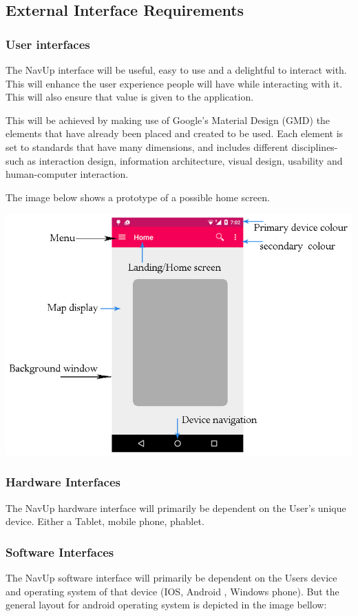 \documentclass[11pt]{article}
\begin{document}
		\subsection{External Interface Requirements}
      	\subsubsection{User interfaces}
				
				The NavUp interface will be useful, easy to use and a delightful to interact with. This will enhance the user experience people will have while interacting with it. This will also ensure that value is given to the application.
				
				This will be achieved by making use of Google's Material Design (GMD) the elements that have already been placed and created to be used. Each element is set to standards that have many dimensions, and includes different disciplines-such as interaction design, information architecture, visual design, usability and human-computer interaction.
				
				The image below shows a prototype of a possible home screen.
				
				\includegraphics[width=0.5\linewidth]{Images/userInterface.jpg}\\[0.5cm]
				
	\subsubsection{Hardware Interfaces}
				The NavUp hardware interface will primarily be dependent on the User’s unique device. Either a Tablet, mobile phone, phablet. 	
					
	\subsubsection{Software Interfaces}
				The NavUp software  interface will primarily be dependent on the Users device and operating system of that device (IOS, Android , Windows phone). But the general layout for android operating system is depicted in the image bellow:
				
\end{document}
